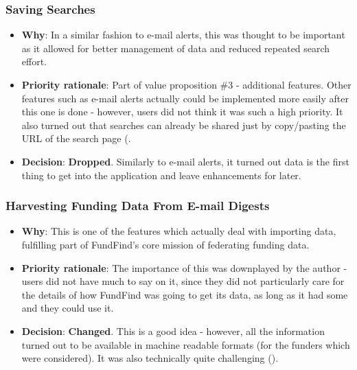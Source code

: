 \subsubsection{Saving Searches}
\label{reqs-saving-searches}
\begin{itemize}
 \item \textbf{Why}: In a similar fashion to e-mail alerts, this was thought to be important as it allowed for better management of data and reduced repeated search effort.
 \item \textbf{Priority rationale}: Part of value proposition \#3 - additional features. Other features such as e-mail alerts actually could be implemented more easily after this one is done - however, users did not think it was such a high priority. It also turned out that searches can already be shared just by copy/pasting the URL of the search page (.
 \item \textbf{Decision}: \textbf{Dropped}. Similarly to e-mail alerts, it turned out data is the first thing to get into the application and leave enhancements for later.
\end{itemize}

\subsubsection{Harvesting Funding Data From E-mail Digests}
\label{devprocess-feats-email-harvest}
\begin{itemize}
 \item \textbf{Why}: This is one of the features which actually deal with importing data, fulfilling part of FundFind's core mission of federating funding data.
 \item \textbf{Priority rationale}: The importance of this was downplayed by the author - users did not have much to say on it, since they did not particularly care for the details of how FundFind was going to get its data, as long as it had some and they could use it.
 \item \textbf{Decision}: \textbf{Changed}. This is a good idea - however, all the information turned out to be available in machine readable formats (for the funders which were considered). It was also technically quite challenging ().
\end{itemize}


